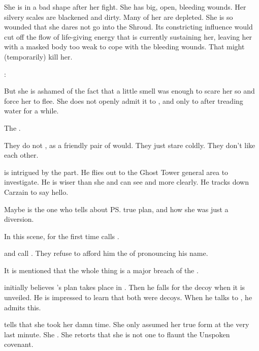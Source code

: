 She is in a bad shape after her fight. 
She has big, open, bleeding wounds. 
Her silvery scales are blackened and dirty. 
Many of her  are depleted. 
She is so wounded that she dares not go into the Shroud. 
Its constricting influence would cut off the flow of life-giving \xsic{} energy that is currently sustaining her, leaving her with a masked body too weak to cope with the bleeding wounds. 
That might (temporarily) kill her. 

\Nzessuacrith: 

But she is ashamed of the fact that a little \sathariah{} smell was enough to scare her so and force her to flee. 
She does not openly admit it to \Ishnaruchaefir, and only to \Secherdamon{} after treading water for a while. 

The \dragons {}. 

They do not , as a friendly pair of \dragons{} would. 
They just stare coldly. 
They don't like each other. 

\Ishnaruchaefir{} is intrigued by the \sathariah{} part. 
He flies out to the Ghost Tower general area to investigate. 
He is wiser than she and can see \matrices{} and \vertices{} more clearly. 
He tracks down Carzain to say hello. 

Maybe \Ishnaruchaefir{} is the one who tells \Nzessuacrith{} about \ps{\Secherdamon} true plan, and how she was just a diversion. 

In this scene, \Nzessuacrith{} for the first time calls \Ishnaruchaefir{} . 

\Nzessuacrith{} and \Secherdamon{} call \Ishnaruchaefir{} . 
They refuse to afford him the \honour of pronouncing his name. 

It is mentioned that the whole thing is a major breach of the \charade. 

\Ishnaruchaefir initially believes \Secherdamon's plan takes place in \Malcur.
Then he falls for the \Forclin decoy when it is unveiled. 
He is impressed to learn that both were decoys. 
When he talks to \Nzessuacrith, he admits this. 

\Secherdamon tells \Nzessuacrith that she took her damn time.
She only assumed her true form at the very last minute. 
She .
She retorts that she is not one to flaunt the Unspoken covenant. 


